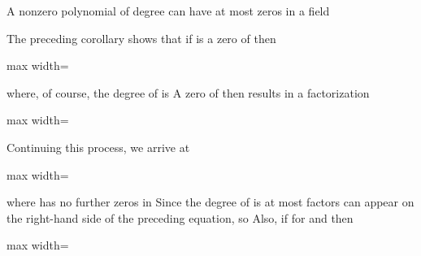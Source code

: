 \documentclass[11pt,oneside]{article}
\begin{document}
\begin{BookBody}

 A nonzero polynomial  of degree  can have at most  zeros in a field 

 The preceding corollary shows that if  is a zero of  then

\begin{center}\begin{adjustbox}{max width=\linewidth}\end{adjustbox}\end{center}

\noindent where, of course, the degree of  is  A zero  of  then results in a factorization

\begin{center}\begin{adjustbox}{max width=\linewidth}\end{adjustbox}\end{center}

\noindent Continuing this process, we arrive at

\begin{center}\begin{adjustbox}{max width=\linewidth}\end{adjustbox}\end{center}

\noindent where  has no further zeros in  Since the degree of  is  at most  factors  can appear on the right-hand side of the preceding equation, so  Also, if  for  and  then

\begin{center}\begin{adjustbox}{max width=\linewidth}\end{adjustbox}\end{center}


\end{BookBody}
\end{document}
